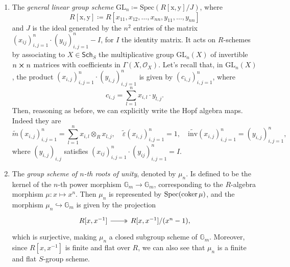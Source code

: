 \documentclass[../Main]{subfiles}
\begin{document}
\begin{ex}
\begin{enumerate}
		\item The {\em general linear group scheme} $\mathrm{GL}_n \coloneqq 
			\mathrm{Spec}(R[\mathrm{x},\mathrm{y}]/J)$,
			where
			\begin{equation*}
				R[\mathrm{x},\mathrm{y}] \coloneqq
				R[x_{11}, x_{12}, \ldots, x_{nn},
				y_{11}, \ldots, y_{nn}]
			\end{equation*} 
			and $J$ is the ideal generated by the $n^2$ entries of the matrix
			$\left( x_{ij} \right)_{i,j=1}^n \cdot \left( y_{ij} \right)_{i,j=1}^n - I$,
			for $I$ the identity matrix.
			It acts on $R$-schemes by associating to
			$X \in \mathsf{Sch}_{ S }$ the multiplicative group
			$\mathrm{GL}_n(X)$ of invertible $n \cross n$
			matrices with coefficients in $\Gamma \left( X , \mathcal{O}_{ X } \right)$.
			Let's recall that, in $\mathrm{GL}_n(X)$, the product
			$\left( x_{i,j} \right)_{i,j = 1}^n \cdot 
			\left( y_{i,j} \right)_{i,j = 1}^n$
			is given by $\left( c_{i,j} \right)_{i,j = 1}^n$, where
			\begin{equation*}
			c_{i,j} = \sum_{l=1}^{n} x_{i,l} \cdot y_{l,j}
			.\end{equation*} 
			Then, reasoning as before, we can explicitly write the Hopf algebra maps.
			Indeed they are
			\begin{equation*}
				\widetilde{m}(x_{i,j})_{i,j=1}^n = \sum_{l=1}^{n} x_{i,l} \otimes_R x_{l,j},
				\quad
				\widetilde{\varepsilon}(x_{i,j})_{i,j=1}^n = 1,
				\quad
				\widetilde{\mathrm{inv}}(x_{i,j})_{i,j=1}^n = (y_{i,j})_{i,j=1}^n
			,\end{equation*} 
			where $\left( y_{i,j} \right)_{i,j}$ satisfies 
			$\left( x_{ij} \right)_{i,j=1}^n \cdot \left( y_{ij} \right)_{i,j=1}^n = I$.


		\item The {\em group scheme of $n$-th roots of unity}, denoted by $\mu_n$.
			Is defined to be the kernel of the $n$-th power morphism
			$\mathbb{G}_m \to \mathbb{G}_m$,
			corresponding to the $R$-algebra morphism
			$\mu\colon x \mapsto x^n$.
			Then $\mu_n$ is represented by $\mathrm{Spec}(\operatorname{coker} \mu)$,
			and the morphism $\mu_n \hookrightarrow \mathbb{G}_m$ is given by the projection
			\begin{equation*}
			\begin{tikzcd}
				R[x,x^{-1}] \arrow[r, "", twoheadrightarrow] &
				R[x,x^{-1}] / (x^n - 1)
			,\end{tikzcd}
			\end{equation*}
			which is surjective, making $\mu_n$
			a closed subgroup scheme of $\mathbb{G}_m$.
			Moreover, since $R[x,x^{-1}]$ is finite and flat over $R$,
			we can also see that $\mu_n$ is a finite and flat $S$-group scheme.



\end{enumerate}
\end{ex}
\end{document}

